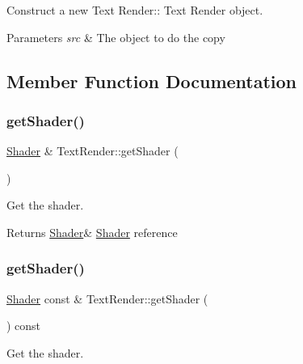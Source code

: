 Construct a new Text Render\+:\+: Text Render object. 


\begin{DoxyParams}{Parameters}
{\em src} & The object to do the copy \\
\hline
\end{DoxyParams}


\subsection{Member Function Documentation}
\mbox{\label{class_text_render_afcb6b4a05cfabeb19c1f6d16ed1635ea}} 
\subsubsection{\texorpdfstring{get\+Shader()}{getShader()}\hspace{0.1cm}{\footnotesize\ttfamily [1/2]}}
{\footnotesize\ttfamily \hyperlink{class_shader}{Shader} \& Text\+Render\+::get\+Shader (\begin{DoxyParamCaption}{ }\end{DoxyParamCaption})}



Get the shader. 

\begin{DoxyReturn}{Returns}
\hyperlink{class_shader}{Shader}\& \hyperlink{class_shader}{Shader} reference 
\end{DoxyReturn}
\mbox{\label{class_text_render_a2f313ec58b45ca41ec145f898aa35dc5}} 
\subsubsection{\texorpdfstring{get\+Shader()}{getShader()}\hspace{0.1cm}{\footnotesize\ttfamily [2/2]}}
{\footnotesize\ttfamily \hyperlink{class_shader}{Shader} const  \& Text\+Render\+::get\+Shader (\begin{DoxyParamCaption}{ }\end{DoxyParamCaption}) const}



Get the shader. 

